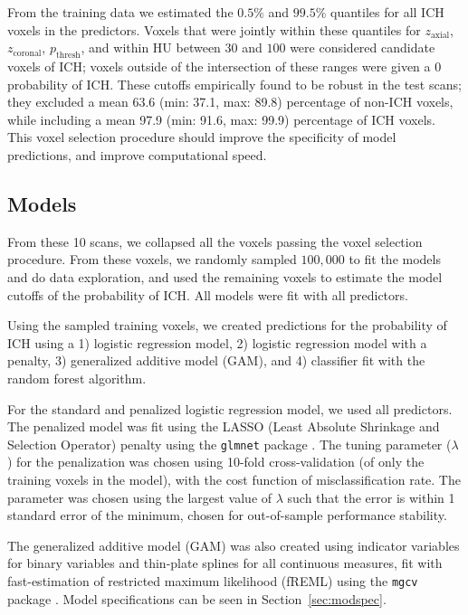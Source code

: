 \documentclass{elsarticle_nonatbib}\usepackage[]{graphicx}\usepackage[]{color}
\newcommand{\pkg}[1]{\texttt{#1}}
\begin{document}
From the training data we estimated the $0.5\%$ and $99.5\%$ quantiles for all ICH voxels in the predictors.  Voxels that were jointly within these quantiles for $z_{\text{axial}}$, $z_{\text{coronal}}$, $p_{\text{thresh}}$, and within HU between $30$ and $100$ were considered candidate voxels of ICH; voxels outside of the intersection of these ranges were given a $0$ probability of ICH. These cutoffs empirically found to be robust in the test scans; they excluded a mean 63.6 (min: 37.1, max: 89.8) percentage of non-ICH voxels, while including a mean 97.9 (min: 91.6, max: 99.9) percentage of ICH voxels.  This voxel selection procedure should improve the specificity of model predictions, and improve computational speed.  

\subsection{Models}

From these 10 scans, we collapsed all the voxels passing the voxel selection procedure.  From these voxels, we randomly sampled $100{,}000$ to fit the models and do data exploration, and used the remaining voxels to estimate the model cutoffs of the probability of ICH.   All models were fit with all predictors.  


Using the sampled training voxels, we created predictions for the probability of ICH using a 1) logistic regression model, 2) logistic regression model with a penalty, 3) generalized additive model (GAM), and 4) classifier fit with the random forest algorithm.

For the standard and penalized logistic regression model, we used all predictors.  The penalized model was fit using the LASSO (Least Absolute Shrinkage and Selection Operator) penalty \citep{tibshirani_regression_1996} using the \pkg{glmnet} package \citep{friedman_regularization_2010}.  The tuning parameter ($\lambda$) for the penalization was chosen using 10-fold cross-validation (of only the training voxels in the model), with the cost function of misclassification rate.  The parameter was chosen using the largest value of $\lambda$ such that the error is within 1 standard error of the minimum, chosen for out-of-sample performance stability.

The generalized additive model (GAM) \citep{hastie_generalized_1986, hastie_generalized_1990} was also created using indicator variables for binary variables and thin-plate splines for all continuous measures, fit with fast-estimation of restricted maximum likelihood (fREML) using the \pkg{mgcv} package \citep{wood_fast_2011, wood_generalized_2015}.   Model specifications can be seen in Section~\ref{sec:modspec}.
\end{document}
